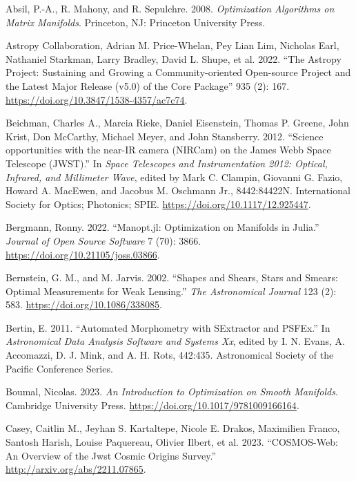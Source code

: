 \documentclass[
]{article}
\newlength{\cslhangindent}
\newenvironment{cslreferences}%
  {\setlength{\parindent}{0pt}%
  \everypar{\setlength{\hangindent}{\cslhangindent}}\ignorespaces}%
  {\par}
\begin{document}
\hypertarget{refs}{}
\begin{cslreferences}
\leavevmode\hypertarget{ref-AbsMahSep2008}{}%
Absil, P.-A., R. Mahony, and R. Sepulchre. 2008. \emph{Optimization
Algorithms on Matrix Manifolds}. Princeton, NJ: Princeton University
Press.

\leavevmode\hypertarget{ref-2022ApJ}{}%
Astropy Collaboration, Adrian M. Price-Whelan, Pey Lian Lim, Nicholas
Earl, Nathaniel Starkman, Larry Bradley, David L. Shupe, et al. 2022.
``The Astropy Project: Sustaining and Growing a Community-oriented
Open-source Project and the Latest Major Release (v5.0) of the Core
Package'' 935 (2): 167. \url{https://doi.org/10.3847/1538-4357/ac7c74}.

\leavevmode\hypertarget{ref-10.1117ux2f12.925447}{}%
Beichman, Charles A., Marcia Rieke, Daniel Eisenstein, Thomas P. Greene,
John Krist, Don McCarthy, Michael Meyer, and John Stansberry. 2012.
``Science opportunities with the near-IR camera (NIRCam) on the James
Webb Space Telescope (JWST).'' In \emph{Space Telescopes and
Instrumentation 2012: Optical, Infrared, and Millimeter Wave}, edited by
Mark C. Clampin, Giovanni G. Fazio, Howard A. MacEwen, and Jacobus M.
Oschmann Jr., 8442:84422N. International Society for Optics; Photonics;
SPIE. \url{https://doi.org/10.1117/12.925447}.

\leavevmode\hypertarget{ref-Bergmann2022}{}%
Bergmann, Ronny. 2022. ``Manopt.jl: Optimization on Manifolds in
Julia.'' \emph{Journal of Open Source Software} 7 (70): 3866.
\url{https://doi.org/10.21105/joss.03866}.

\leavevmode\hypertarget{ref-Bernstein_2002}{}%
Bernstein, G. M., and M. Jarvis. 2002. ``Shapes and Shears, Stars and
Smears: Optimal Measurements for Weak Lensing.'' \emph{The Astronomical
Journal} 123 (2): 583. \url{https://doi.org/10.1086/338085}.

\leavevmode\hypertarget{ref-2011ASPC}{}%
Bertin, E. 2011. ``Automated Morphometry with SExtractor and PSFEx.'' In
\emph{Astronomical Data Analysis Software and Systems Xx}, edited by I.
N. Evans, A. Accomazzi, D. J. Mink, and A. H. Rots, 442:435.
Astronomical Society of the Pacific Conference Series.

\leavevmode\hypertarget{ref-boumal2023intromanifolds}{}%
Boumal, Nicolas. 2023. \emph{An Introduction to Optimization on Smooth
Manifolds}. Cambridge University Press.
\url{https://doi.org/10.1017/9781009166164}.

\leavevmode\hypertarget{ref-casey2023cosmosweb}{}%
Casey, Caitlin M., Jeyhan S. Kartaltepe, Nicole E. Drakos, Maximilien
Franco, Santosh Harish, Louise Paquereau, Olivier Ilbert, et al. 2023.
``COSMOS-Web: An Overview of the Jwst Cosmic Origins Survey.''
\url{http://arxiv.org/abs/2211.07865}.


\end{cslreferences}
\end{document}
